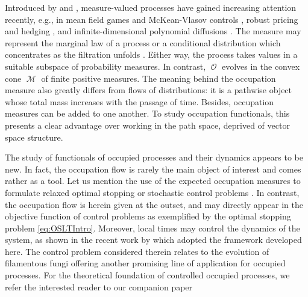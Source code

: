 \documentclass[11pt]{article}
\theoremstyle{plain}
\theoremstyle{definition}
\DeclareMathOperator{\calM}{\mathcal{M}}
\DeclareMathOperator{\calO}{\mathcal{O}}
\begin{document}
Introduced by \citet{Dawson75,Dawson93} and  \citet{FlemingViot}, measure-valued processes  have gained increasing attention  recently, e.g.,  in mean field games and  McKean-Vlasov controls \cite{CardDelLasLio,CarmonaDelarue,LasryLions,TTZ,TTZ2}, robust pricing and hedging   \cite{CoxKallblad,Larsson}, and infinite-dimensional polynomial diffusions \cite{CuchieroLarsson,Cuchiero2021}. The measure may represent the marginal law of a process 
or  
a conditional distribution 
which concentrates as the filtration unfolds \cite{CoxKallblad,Larsson}. 
Either way, the process takes values 
in a   suitable subspace  of  probability measures. 
In contrast, $\calO$ 
evolves  in the convex cone $\calM$ of finite positive  measures. The  meaning  behind  the occupation measure also greatly differs from flows of distributions: it is a pathwise object whose total mass  increases 
with the passage of time. Besides, occupation measures can be  added to one another. To study occupation functionals, 
this  presents   a clear advantage over  working in
the path space,  deprived of vector space structure.  

The study of functionals  of occupied processes and their dynamics appears to be new. 
In fact, the  occupation flow  is rarely the main object of interest and 
comes  rather
as a  
tool. Let us 
mention  the use of the expected occupation measures 
to formulate relaxed optimal stopping or stochastic control problems \cite{Bhatt,Tankov, FlemingVermes}. In contrast, the occupation flow is herein  given at  the outset, and may directly appear in the objective function of control problems as 
 exemplified by the optimal stopping problem \eqref{eq:OSLTIntro}. 
 Moreover, local times may control the dynamics of the system, as shown in the recent work by \citet{Bethencourt} which  adopted the framework developed here. The control problem considered therein relates to the evolution of filamentous fungi  \cite{tomaševićFungus,BoswellDavidson} offering another promising line of application for occupied processes.
  For the theoretical foundation of controlled occupied processes, we refer the interested reader to our companion  paper \cite{SonerTissotZhang}
 
\end{document}
